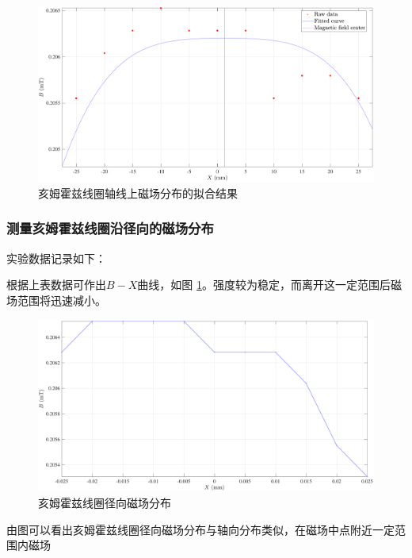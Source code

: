 \documentclass[UTF8]{article}
\theoremstyle{MyLineTheoremStyle} %
\theoremstyle{MyBlockTheoremStyle} %
\theoremstyle{MySubsubsectionStyle} %
\begin{document}
\begin{figure}[H]\centering
    \includegraphics[width=0.9\columnwidth]{assets/2/7.pdf}
    \caption{亥姆霍兹线圈轴线上磁场分布的拟合结果}
\end{figure}

\subsubsection{测量亥姆霍兹线圈沿径向的磁场分布}
实验数据记录如下：
\begin{table}[H]\centering
    \caption{亥姆霍兹线圈的径向磁场分布}
    \label{亥姆霍兹线圈的径向磁场分布}
\end{table}
根据上表数据可作出$ B-X $曲线，如图 \ref{亥姆霍兹线圈径向磁场分布}。强度较为稳定，而离开这一定范围后磁场范围将迅速减小。
\begin{figure}[H]\centering
    \includegraphics[width=0.9\columnwidth]{assets/2/8.pdf}
    \caption{亥姆霍兹线圈径向磁场分布}
    \label{亥姆霍兹线圈径向磁场分布}
\end{figure}
由图可以看出亥姆霍兹线圈径向磁场分布与轴向分布类似，在磁场中点附近一定范围内磁场
\end{document}
